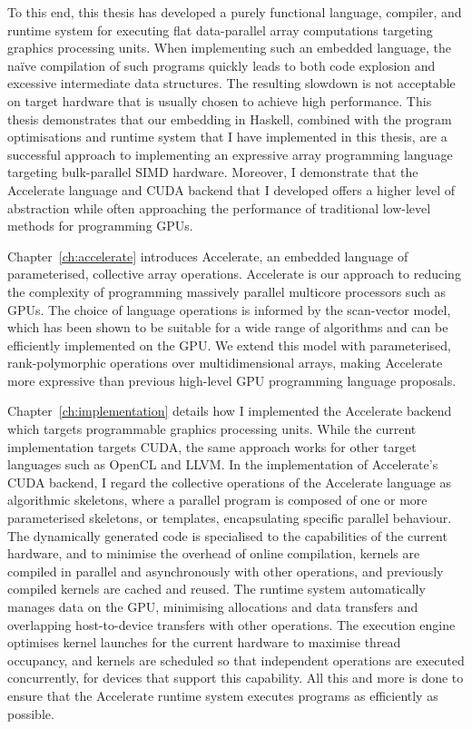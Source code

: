 To this end, this thesis has developed a purely functional language, compiler,
and runtime system for executing flat data-parallel array computations targeting
graphics processing units. When implementing such an embedded language, the
na\"ive compilation of such programs quickly leads to both code explosion and
excessive intermediate data structures. The resulting slowdown is not acceptable
on target hardware that is usually chosen to achieve high performance. This
thesis demonstrates that our embedding in Haskell, combined with the program
optimisations and runtime system that I have implemented in this thesis, are a
successful approach to implementing an expressive array programming language
targeting bulk-parallel SIMD hardware. Moreover, I demonstrate that the
Accelerate language and CUDA backend that I developed offers a higher level of
abstraction while often approaching the performance of traditional low-level
methods for programming GPUs.

Chapter~\ref{ch:accelerate} introduces Accelerate, an embedded language of
parameterised, collective array operations. Accelerate is our approach to
reducing the complexity of programming massively parallel multicore processors
such as GPUs. The choice of language operations is informed by the scan-vector
model, which has been shown to be suitable for a wide range of algorithms and
can be efficiently implemented on the GPU\@. We extend this model with
parameterised, rank-polymorphic operations over multidimensional arrays, making
Accelerate more expressive than previous high-level GPU programming language
proposals.

Chapter~\ref{ch:implementation} details how I implemented the Accelerate backend
which targets programmable graphics processing units. While the current
implementation targets CUDA, the same approach works for other target languages
such as OpenCL and LLVM. In the implementation of Accelerate's CUDA backend, I
regard the collective operations of the Accelerate language as algorithmic
skeletons, where a parallel program is composed of one or more parameterised
skeletons, or templates, encapsulating specific parallel behaviour. The
dynamically generated code is specialised to the capabilities of the current
hardware, and to minimise the overhead of online compilation, kernels are
compiled in parallel and asynchronously with other operations, and previously
compiled kernels are cached and reused. The runtime system automatically manages
data on the GPU, minimising allocations and data transfers and overlapping
host-to-device transfers with other operations. The execution engine optimises
kernel launches for the current hardware to maximise thread occupancy, and
kernels are scheduled so that independent operations are executed concurrently,
for devices that support this capability. All this and more is done to ensure
that the Accelerate runtime system executes programs as efficiently as possible.

